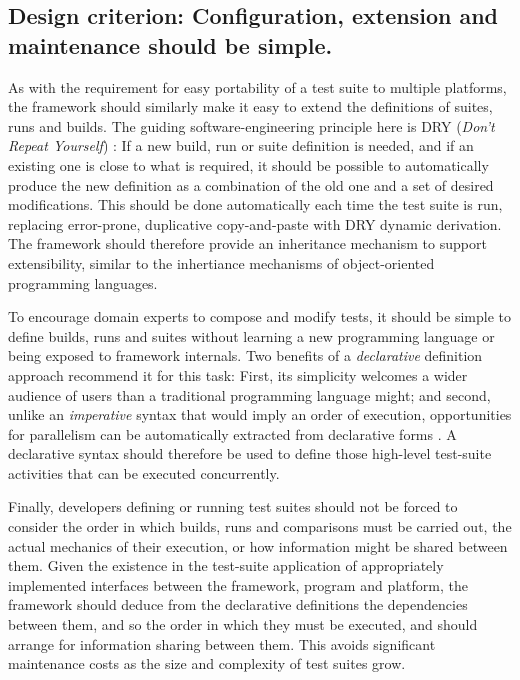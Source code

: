 \documentclass[conference]{IEEEtran}
\begin{document}
\subsection{Design criterion: Configuration, extension and maintenance should be simple.}

As with the requirement for easy portability of a test suite to multiple platforms, the framework should similarly make it easy to extend the definitions of suites, runs and builds. The guiding software-engineering principle here is DRY (\emph{Don't Repeat Yourself}) \cite{prags}: If a new build, run or suite definition is needed, and if an existing one is close to what is required, it should be possible to automatically produce the new definition as a combination of the old one and a set of desired modifications. This should be done automatically each time the test suite is run, replacing error-prone, duplicative copy-and-paste with DRY dynamic derivation. The framework should therefore provide an inheritance mechanism to support extensibility, similar to the inhertiance mechanisms of object-oriented programming languages.

To encourage domain experts to compose and modify tests, it should be simple to define builds, runs and suites without learning a new programming language or being exposed to framework internals. Two benefits of a \emph{declarative} definition approach recommend it for this task: First, its simplicity welcomes a wider audience of users than a traditional programming language might; and second, unlike an \emph{imperative} syntax that would imply an order of execution, opportunities for parallelism can be automatically extracted from declarative forms \cite{decl-advantages}. A declarative syntax should therefore be used to define those high-level test-suite activities that can be executed concurrently.

Finally, developers defining or running test suites should not be forced to consider the order in which builds, runs and comparisons must be carried out, the actual mechanics of their execution, or how information might be shared between them. Given the existence in the test-suite application of appropriately implemented interfaces between the framework, program and platform, the framework should deduce from the declarative definitions the dependencies between them, and so the order in which they must be executed, and should arrange for information sharing between them. This avoids significant maintenance costs as the size and complexity of test suites grow.
\end{document}
